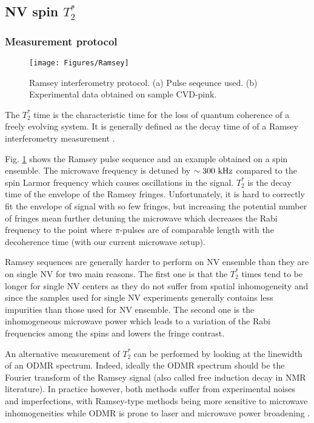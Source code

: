 \documentclass[a4paper,11pt]{report}
\begin{document}
\subsection{NV spin $T_2^*$}
\subsubsection{Measurement protocol}
\begin{figure}[h!]
\centering
\texttt{[image: Figures/Ramsey]}
\caption{Ramsey interferometry protocol. (a) Pulse seqeunce used. (b) Experimental data obtained on sample CVD-pink.} %
\label{Ramsey}
\end{figure}

The $T_2^*$ time is the characteristic time for the loss of quantum coherence of a freely evolving system. It is generally defined as the decay time of of a Ramsey interferometry measurement \citep{barry2020sensitivity}.

Fig. \ref{Ramsey} shows the Ramsey pulse sequence and an  example obtained on a spin ensemble. The microwave frequency is detuned by $\sim 300\ \rm kHz$ compared to the spin Larmor frequency which causes oscillations in the signal. $T_2^*$ is the decay time of the envelope of the Ramsey fringes. Unfortunately, it is hard to correctly fit the envelope of signal with so few fringes, but increasing the potential number of fringes mean further detuning the microwave which decreases the Rabi frequency to the point where $\pi$-pulses are of comparable length with the decoherence time (with our current microwave setup).

Ramsey sequences are generally harder to perform on NV ensemble than they are on single NV for two main reasons. The first one is that the $T_2^*$ times tend to be longer for single NV centers as they do not suffer from spatial inhomogeneity and since the samples used for single NV experiments generally contains less impurities than those used for NV ensemble. The second one is the inhomogeneous microwave power which leads to a variation of the Rabi frequencies among the spins \citep{barry2016optical, zhou2020quantum} and lowers the fringe contrast.

An alternative measurement of $T_2^*$ can be performed by looking at the linewidth of an ODMR spectrum. Indeed, ideally the ODMR spectrum should be the Fourier transform of the Ramsey signal (also called free induction decay in NMR literature). In practice however, both methods suffer from experimental noises and imperfections, with Ramsey-type methods being more sensitive to microwave inhomogeneities \citep{barry2020sensitivity} while ODMR is prone to laser and microwave power broadening \citep{dreau2011avoiding}. 
\end{document}
